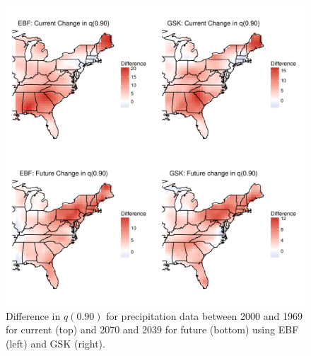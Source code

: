 \documentclass[11pt]{article}
\begin{document}
\begin{figure}[htbp]  %
  \centering
  \includegraphics[width=\linewidth]{plots/precip-q90diff-compare.pdf}
  \caption{Difference in $q(0.90)$ for precipitation data between 2000 and 1969 for current (top) and 2070 and 2039 for future (bottom) using EBF (left) and GSK (right).}
  \label{ebfig:precip-q90diff}
\end{figure}



\end{document}
